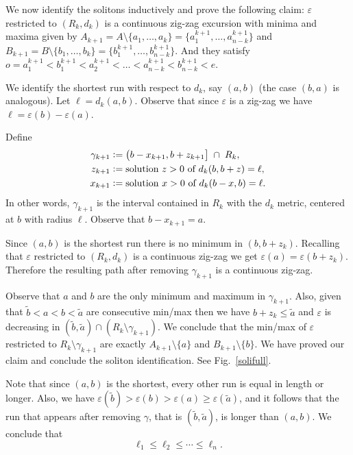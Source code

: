 \documentclass[12pt]{article}
\numberwithin{equation}{section}
\newcommand{\eps}{\varepsilon}
\begin{document}
We now identify the solitons inductively and prove the following claim: $\eps$ restricted to $(R_k, d_k)$ is a continuous zig-zag excursion with minima and maxima given by $A_{k+1}=A\setminus \{a_1, \dots, a_k\}=\{a^{k+1}_1,\dots,a_{n-k}^{k+1}\}$ and
$B_{k+1}=B\setminus \{b_1, \dots, b_k\}=\{b^{k+1}_1,\dots,b_{n-k}^{k+1}\}$.
And they satisfy $o=a_1^{k+1}<b_1^{k+1}<a_2^{k+1}<\dots<a_{n-k}^{k+1}<b_{n-k}^{k+1}<e$.

We identify the shortest run with respect to $d_k$, say $(a,b)$ (the case $(b,a)$ is analogous).
Let $\ell= d_k(a, b)$.
Observe that since $\eps$ is a zig-zag we have $\ell= \eps(b)-\eps(a)$.

Define
\begin{align}
 \gamma_{k+1}&\vcentcolon = \bigl(b-x_{k+1},b+z_{k+1}\bigr]\;\cap\; R_k, \label{sol6}
 \\
 z_{k+1} &\vcentcolon =\text{solution $z>0$ of } d_{k}(b, b+z)=\ell,\notag
 \\
 x_{k+1} &\vcentcolon =\text{solution $x>0$ of } d_{k}(b-x,b)=\ell.\notag
\end{align}
In other words, $\gamma_{k+1}$ is the interval contained in $R_k$ with the $d_k$ metric, centered at $b$ with radius $\ell$.
Observe that $b-x_{k+1} =a$.  

Since $(a,b)$ is the shortest run there is no minimum in $(b,b+z_{k})$.
Recalling that $\eps$ restricted to $(R_k, d_k)$ is a continuous zig-zag we get $\eps(a)=\eps(b+z_{k})$.
Therefore the resulting path after removing $\gamma_{k+1}$ is a continuous zig-zag.

Observe that $a$ and $b$ are the only minimum and maximum in $\gamma_{k+1}$.
Also, given that $\tilde b < a < b < \tilde a$ are consecutive min/max then we have $b+z_{k}\leq\tilde a$ and $\eps$ is decreasing in $(\tilde b,\tilde a)\cap (R_k\setminus \gamma_{k+1})$.
We conclude that the min/max of $\eps$ restricted to $R_k\setminus \gamma_{k+1}$ are exactly $A_{k+1}\setminus \{a\}$ and $B_{k+1}\setminus \{b\}$.
We have proved our claim and conclude the soliton identification.
See Fig.~\ref{solifull}.


Note that since $(a,b)$ is the shortest, every other run is equal in length or longer. Also, 
we have $\eps(\tilde b)>\eps(b)>\eps(a)\ge\eps(\tilde a)$, and it follows that the run that appears after removing $\gamma$, that is $(\tilde b,\tilde a)$, is longer than 
$(a,b)$.
We conclude that 
\begin{equation}
\ell_1\leq \ell_2\leq \cdots\leq \ell_n.
\label{orderedell}
\end{equation}
\end{document}
